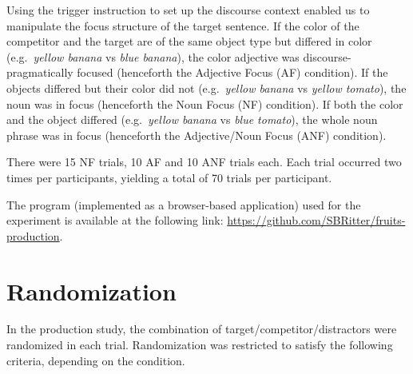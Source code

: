\documentclass[
  12pt,
]{article}
\begin{document}
Using the trigger instruction to set up the discourse context enabled us to manipulate the focus structure of the target sentence.
If the color of the competitor and the target are of the same object type but differed in color (e.g.~\emph{yellow banana} vs \emph{blue banana}), the color adjective was discourse-pragmatically focused (henceforth the Adjective Focus (AF) condition).
If the objects differed but their color did not (e.g.~\emph{yellow banana} vs \emph{yellow tomato}), the noun was in focus (henceforth the Noun Focus (NF) condition).
If both the color and the object differed (e.g.~\emph{yellow banana} vs \emph{blue tomato}), the whole noun phrase was in focus (henceforth the Adjective/Noun Focus (ANF) condition).

There were 15 NF trials, 10 AF and 10 ANF trials each.
Each trial occurred two times per participants, yielding a total of 70 trials per participant.

The program (implemented as a browser-based application) used for the experiment is available at the following link: \url{https://github.com/SBRitter/fruits-production}.

\appendix

\hypertarget{random}{%
\section{Randomization}\label{random}}

In the production study, the combination of target/competitor/distractors were randomized in each trial.
Randomization was restricted to satisfy the following criteria, depending on the condition.
\end{document}
